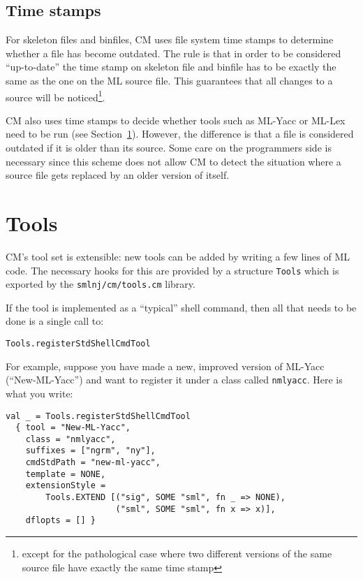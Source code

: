 \documentclass{article}
\begin{document}
\subsection{Time stamps}

For skeleton files and binfiles, CM uses file system time stamps to
determine whether a file has become outdated.  The rule is that in
order to be considered ``up-to-date'' the time stamp on skeleton file
and binfile has to be exactly the same as the one on the ML source
file.  This guarantees that all changes to a source will be
noticed\footnote{except for the pathological case where two different
versions of the same source file have exactly the same time stamp}.

CM also uses time stamps to decide whether tools such as ML-Yacc or
ML-Lex need to be run (see Section~\ref{sec:tools}).  However, the
difference is that a file is considered outdated if it is older than
its source.  Some care on the programmers side is necessary since this
scheme does not allow CM to detect the situation where a source file
gets replaced by an older version of itself.

\section{Tools}
\label{sec:tools}

CM's tool set is extensible: new tools can be added by writing a few
lines of ML code.  The necessary hooks for this are provided by a
structure {\tt Tools} which is exported by the {\tt smlnj/cm/tools.cm}
library.

If the tool is implemented as a ``typical'' shell command, then all
that needs to be done is a single call to:

\begin{verbatim}
Tools.registerStdShellCmdTool
\end{verbatim}

For example, suppose you have made a
new, improved version of ML-Yacc (``New-ML-Yacc'') and want to
register it under a class called {\tt nmlyacc}.  Here is what you
write:

\begin{verbatim}
val _ = Tools.registerStdShellCmdTool
  { tool = "New-ML-Yacc",
    class = "nmlyacc",
    suffixes = ["ngrm", "ny"],
    cmdStdPath = "new-ml-yacc",
    template = NONE,
    extensionStyle =
        Tools.EXTEND [("sig", SOME "sml", fn _ => NONE),
                      ("sml", SOME "sml", fn x => x)],
    dflopts = [] }
\end{verbatim}
\end{document}
